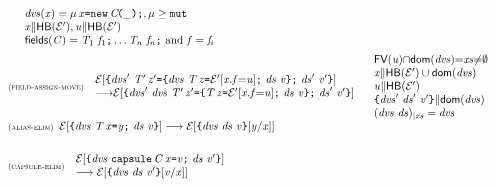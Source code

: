 \begin{figure}[ht]
{\begin{small}
\begin{math}
\begin{array}{l}
{\begin{array}{l}
{}
\end{array}
}
{
\begin{array}{l}
\dvs(\x)=\Dec{\mu}{\x}{\ConstrCall{\C}{\_}},{\mu\geq\mutable}\\
{\noCapture{\x}{\HB{\ctxP}},\noCapture{\valPrime}{\HB{\ctxP}}}\\
\fields{\C}=\Field{\T_1}{\f_1}\ldots\Field{\T_n}{\f_n}\ \mbox{and}\  \f=\f_i
\end{array}
}
\\[4ex]
\NamedRuleOL{field-assign-move}
{
\begin{array}{l}
\Ctx{\Block
	{\dvs'\
		\Dec{\T'}{\z'}
		{\Block
			{\dvs\
			\Dec{\T}{\z}
			{\CtxP{\x.\f{=}{\valPrime}}
			}\
			\decs
			}
			{\val}
		}\
		\decs'
	}
	{\val'}}\\
{\longrightarrow}
	\Ctx{\Block{\dvs'\
		\dvs\
		\Dec{\T'}{\z'}
		{
		\Block{
			\Dec{\T}{\z}
			{\CtxP{\x.\f{=}{\valPrime}}
			}\
			\decs
		}
		{\val}
		}\ 
		\decs'
	}
	{\val'}	}
\end{array}
}{
\begin{array}{l}
\hspace{-.2cm}\FV{\valPrime}{\cap}\dom{\dvs}{=}\xs{\neq}\emptyset\\
\hspace{-.2cm}\noCapture{\x}{\HB{\ctxP}\cup\dom{\dvs}}\\
\hspace{-.2cm}\noCapture{\valPrime}{\HB{\ctxP}}\\
\hspace{-.2cm}{\noCapture{\Block{\dvs'\ \decs'}{\val'}}{\dom{\dvs}}}\\
\hspace{-.2cm}{\Reduct{(\dvs\ \decs)}{{\xs}}=\dvs}
\end{array}
}
\\[4ex]
\NamedRuleOL{alias-elim}{\reduce{\Ctx{\Block{\dvs\ \Dec{\T}{\x}{\y}\ \decs }{\val}}}{\Ctx{\Subst{\Block{\dvs\ \decs}{\val}}{\y}{\x}}}}
{}
\\[4ex]
\NamedRuleOL{capsule-elim}{
\begin{array}{l}
{\Ctx{\Block{\dvs\ \Dec{\Type{\capsule}
{\C}}{\x}{{\val}}\ \decs }{\val'}}}
\\ \longrightarrow
{\Ctx{\Subst{\Block{\dvs\ \decs}{\val'}}{{\val}}{\x}}}
\end{array}
}
{%
}
\\[4ex]

\end{array}
\end{math}
\end{small}}
\end{figure}
